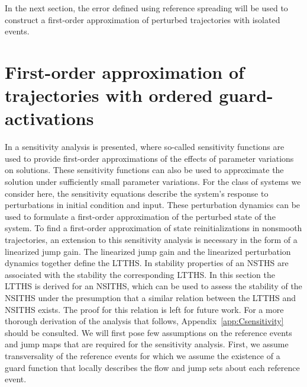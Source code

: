 \documentclass[../DC2017114Bouma.tex]{subfiles}
\begin{document}
In the next section, the error defined using reference spreading will be used to construct a first-order approximation of perturbed trajectories with isolated events.

\section{First-order approximation of trajectories with ordered guard-activations}\label{sec:3approx}
In \cite{Khalil1996} a sensitivity analysis is presented, where so-called sensitivity functions are used to provide first-order approximations of the effects of parameter variations on solutions. These sensitivity functions can also be used to approximate the solution under sufficiently small parameter variations. For the class of systems we consider here, the sensitivity equations describe the system's response to perturbations in initial condition and input. These perturbation dynamics can be used to formulate a first-order approximation of the perturbed state of the system. To find a first-order approximation of state reinitializations in nonsmooth trajectories, an extension to this sensitivity analysis is necessary in the form of a linearized jump gain. The linearized jump gain and the linearized perturbation dynamics together define the LTTHS. In \cite{Rijnen2017} stability properties of an NSTHS are associated with the stability the corresponding LTTHS. In this section the LTTHS is derived for an NSITHS, which can be used to assess the stability of the NSITHS under the presumption that a similar relation between the LTTHS and NSITHS exists. The proof for this relation is left for future work. For a more thorough derivation of the analysis that follows, Appendix~\ref{app:Csensitivity} should be consulted. We will first pose few assumptions on the reference events and jump maps that are required for the sensitivity analysis. First, we assume transversality of the reference events for which we assume the existence of a guard function that locally describes the flow and jump sets about each reference event.
\end{document}

